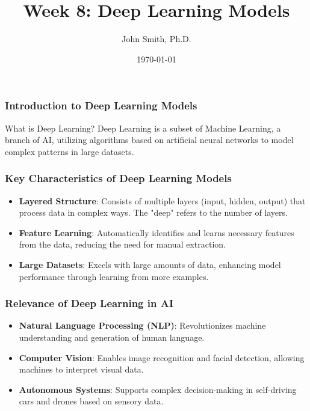 \documentclass[aspectratio=169]{beamer}
\title[Week 8: Deep Learning Models]{Week 8: Deep Learning Models}
\author[J. Smith]{John Smith, Ph.D.}
\institute[University Name]{
  Department of Computer Science\\
  University Name\\
  \vspace{0.3cm}
  Email: email@university.edu\\
  Website: www.university.edu
}
\date{\today}
\begin{document}
\frame{\titlepage}

\begin{frame}[fragile]
    \frametitle{Introduction to Deep Learning Models}
    \begin{block}{What is Deep Learning?}
        Deep Learning is a subset of Machine Learning, a branch of AI, utilizing algorithms based on artificial neural networks to model complex patterns in large datasets.
    \end{block}
\end{frame}

\begin{frame}[fragile]
    \frametitle{Key Characteristics of Deep Learning Models}
    \begin{itemize}
        \item \textbf{Layered Structure}: Consists of multiple layers (input, hidden, output) that process data in complex ways. The "deep" refers to the number of layers.
        
        \item \textbf{Feature Learning}: Automatically identifies and learns necessary features from the data, reducing the need for manual extraction.
        
        \item \textbf{Large Datasets}: Excels with large amounts of data, enhancing model performance through learning from more examples.
    \end{itemize}
\end{frame}

\begin{frame}[fragile]
    \frametitle{Relevance of Deep Learning in AI}
    \begin{itemize}
        \item \textbf{Natural Language Processing (NLP)}: Revolutionizes machine understanding and generation of human language.
        
        \item \textbf{Computer Vision}: Enables image recognition and facial detection, allowing machines to interpret visual data.
        
        \item \textbf{Autonomous Systems}: Supports complex decision-making in self-driving cars and drones based on sensory data.
    \end{itemize}
\end{frame}
\end{document}
